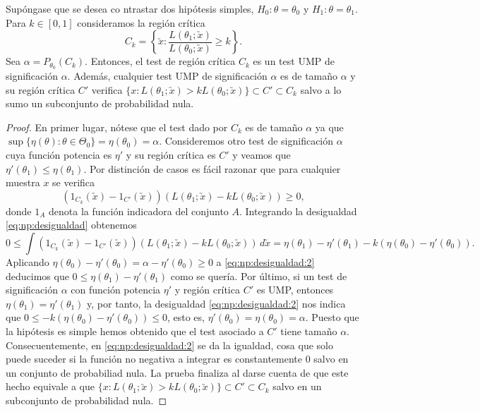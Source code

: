         \begin{thm} \label{thm:np:1}
            Supóngase que se desea co   ntrastar dos hipótesis simples, $H_0 : \theta = \theta_0$ y $H_1 : \theta = \theta_1$. Para $k \in [0,1]$ consideramos la región crítica
            \[C_k = \left\{\utilde{x}: \frac{L(\theta_1;\utilde{x})}{L(\theta_0;\utilde{x})} \ge k\right\}.\]
            Sea $\alpha = P_{\theta_0}(C_k)$. Entonces, el test de región crítica $C_k$ es un test UMP de significación $\alpha$. Además, cualquier test UMP de significación $\alpha$ es de tamaño $\alpha$ y su región crítica $C'$ verifica $\{x: L(\theta_1;\utilde{x}) > k L(\theta_0;\utilde{x})\} \subset C' \subset C_k$ salvo a lo sumo un subconjunto de probabilidad nula.
        \end{thm}
        \begin{proof}
            En primer lugar, nótese que el test dado por $C_k$ es de tamaño $\alpha$ ya que $\sup\{ \eta(\theta) : \theta \in \Theta_0\} = \eta(\theta_0) = \alpha$. Consideremos otro test de significación $\alpha$ cuya función potencia es $\eta'$ y su región crítica es $C'$ y veamos que $\eta'(\theta_1) \le \eta(\theta_1)$. Por distinción de casos es fácil razonar que para cualquier muestra $x$ se verifica
            \begin{equation} \label{eq:np:desigualdad}
                (1_{C_k}(\utilde{x})-1_{C'}(\utilde{x})) (L(\theta_1; \utilde{x}) - k L(\theta_0; \utilde{x})) \ge 0,
            \end{equation}
            donde $1_A$ denota la función indicadora del conjunto $A$. Integrando la desigualdad \eqref{eq:np:desigualdad} obtenemos
            \begin{equation} \label{eq:np:desigualdad:2}
                0 \le \int(1_{C_k}(\utilde{x})-1_{C'}(\utilde{x})) (L(\theta_1; \utilde{x}) - k L(\theta_0; \utilde{x})) \, d\utilde{x} = \eta(\theta_1) - \eta'(\theta_1) - k (\eta(\theta_0) - \eta'(\theta_0)).
            \end{equation}
            Aplicando $\eta(\theta_0) - \eta'(\theta_0) = \alpha  - \eta'(\theta_0) \ge 0$ a \eqref{eq:np:desigualdad:2} deducimos que $0 \le \eta(\theta_1) - \eta'(\theta_1)$ como se quería. Por último, si un test de significación $\alpha$ con función potencia $\eta'$ y región crítica $C'$ es UMP, entonces $\eta(\theta_1) = \eta'(\theta_1)$ y, por tanto, la desigualdad \eqref{eq:np:desigualdad:2} nos indica que $0 \le -k(\eta(\theta_0) - \eta'(\theta_0)) \le 0$, esto es, $\eta'(\theta_0) = \eta(\theta_0) = \alpha$. Puesto que la hipótesis es simple hemos obtenido que el test asociado a $C'$ tiene tamaño $\alpha$. Consecuentemente, en \eqref{eq:np:desigualdad:2} se da la igualdad, cosa que solo puede suceder si la función no negativa a integrar es constantemente 0 salvo en un conjunto de probabiliad nula. La prueba finaliza al darse cuenta de que este hecho equivale a que $\{x: L(\theta_1;\utilde{x}) > k L(\theta_0;\utilde{x})\} \subset C' \subset C_k$ salvo en un subconjunto de probabilidad nula.
        \end{proof}

